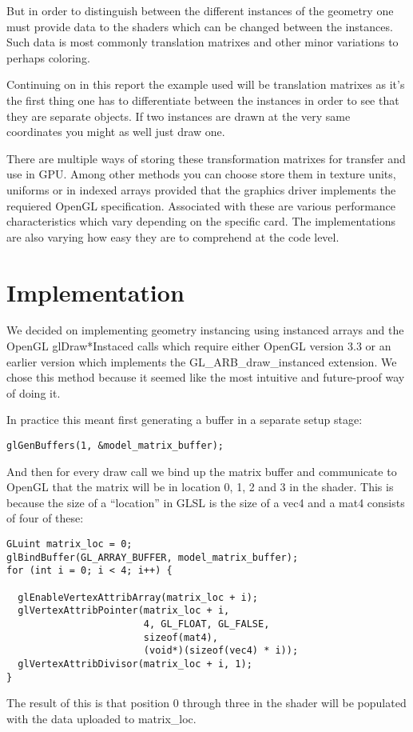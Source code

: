 \documentclass[a4paper,12pt]{article}
\begin{document}
But in order to distinguish between the different instances of the geometry one must provide data to the shaders which can be changed between the instances. Such data is most commonly translation matrixes and other minor variations to perhaps coloring.

Continuing on in this report the example used will be translation matrixes as it's the first thing one has to differentiate between the instances in order to see that they are separate objects. If two instances are drawn at the very same coordinates you might as well just draw one.

There are multiple ways of storing these transformation matrixes for transfer and use in GPU. Among other methods you can choose store them in texture units, uniforms or in indexed arrays provided that the graphics driver implements the requiered OpenGL specification. Associated with these are various performance characteristics which vary depending on the specific card. The implementations are also varying how easy they are to comprehend at the code level.


\section{Implementation}

We decided on implementing geometry instancing using instanced arrays and the OpenGL glDraw*Instaced calls which require either OpenGL version 3.3 or an earlier version which implements the GL\_ARB\_draw\_instanced extension. We chose this method because it seemed like the most intuitive and future-proof way of doing it.

In practice this meant first generating a buffer in a separate setup stage:

\begin{lstlisting}
glGenBuffers(1, &model_matrix_buffer);
\end{lstlisting}
\noindent
And then for every draw call we bind up the matrix buffer and communicate to OpenGL that the matrix will be in location 0, 1, 2 and 3 in the shader. This is because the size of a ``location'' in GLSL is the size of a vec4 and a mat4 consists of four of these:
\begin{lstlisting}
GLuint matrix_loc = 0;
glBindBuffer(GL_ARRAY_BUFFER, model_matrix_buffer);
for (int i = 0; i < 4; i++) {

  glEnableVertexAttribArray(matrix_loc + i);
  glVertexAttribPointer(matrix_loc + i,
                        4, GL_FLOAT, GL_FALSE,
                        sizeof(mat4),
                        (void*)(sizeof(vec4) * i));
  glVertexAttribDivisor(matrix_loc + i, 1);
}
\end{lstlisting}
\noindent
The result of this is that position 0 through three in the shader will be populated with the data uploaded to matrix\_loc.
\end{document}
